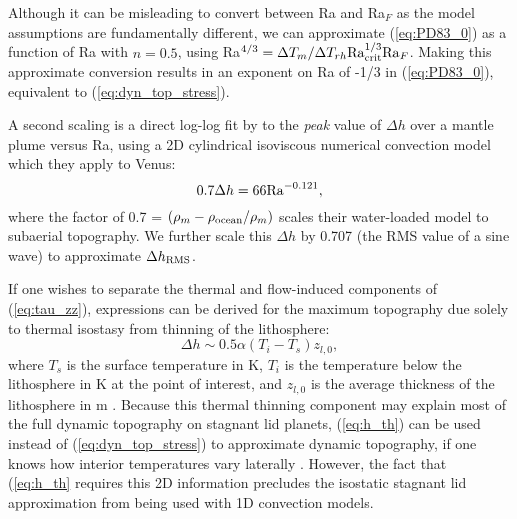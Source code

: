 Although it can be misleading to convert between Ra and Ra$_F$ as the model assumptions are fundamentally different, we can approximate (\ref{eq:PD83_0}) as a function of Ra with $n = 0.5$, using Ra$^{4/3} = \Delta T_m / \Delta T_{rh} {\rm Ra}_{\rm crit}^{1/3} {\rm Ra}_F$. Making this approximate conversion results in an exponent on Ra of -1/3 in (\ref{eq:PD83_0}), equivalent to (\ref{eq:dyn_top_stress}). 





A second scaling is a direct log-log fit by \citep{Kiefer1992} to the \emph{peak} value of $\Delta h$ over a mantle plume versus Ra, using a 2D cylindrical isoviscous numerical convection model which they apply to Venus:
\begin{equation}\label{eq:KH92}
0.7 \Delta h = 66 {\rm Ra}^{-0.121},
\end{equation}
where the factor of 0.7 = $(\rho_m - \rho_{\rm ocean} / \rho_m)$ scales their water-loaded model to subaerial topography. We further scale this $\Delta h$ by 0.707 (the RMS value of a sine wave) to approximate $\Delta h_{\rm RMS}$.

 



If one wishes to separate the thermal and flow-induced components of (\ref{eq:tau_zz}), expressions can be derived for the maximum topography due solely to thermal isostasy from thinning of the lithosphere: 
\begin{equation}\label{eq:h_th}
\Delta h \sim 0.5\alpha (T_i - T_s) z_{l, 0},
\end{equation}
where $T_s$ is the surface temperature in K, $T_i$ is the temperature below the lithosphere in K at the point of interest, and $z_{l, 0}$ is the average thickness of the lithosphere in m \citep{Kucinskas1994, Orth2011}. Because this thermal thinning component may explain most of the full dynamic topography on stagnant lid planets, (\ref{eq:h_th}) can be used instead of (\ref{eq:dyn_top_stress}) to approximate dynamic topography, if one knows how interior temperatures vary laterally \citep[the ``isostatic stagnant lid approximation";][]{Orth2011}. However, the fact that (\ref{eq:h_th} requires this 2D information precludes the isostatic stagnant lid approximation from being used with 1D convection models.























